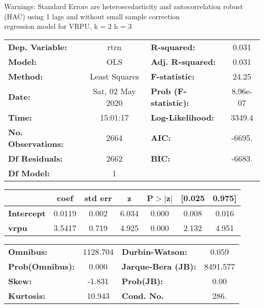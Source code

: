 Warnings: \newline
 [1] Standard Errors are heteroscedasticity and autocorrelation robust (HAC) using 1 lags and without small sample correction\\ 

regression model for VRPU, k = 2 h = 3\begin{center}
\begin{tabular}{lclc}
\toprule
\textbf{Dep. Variable:}    &       rtrn       & \textbf{  R-squared:         } &     0.031   \\
\textbf{Model:}            &       OLS        & \textbf{  Adj. R-squared:    } &     0.031   \\
\textbf{Method:}           &  Least Squares   & \textbf{  F-statistic:       } &     24.25   \\
\textbf{Date:}             & Sat, 02 May 2020 & \textbf{  Prob (F-statistic):} &  8.96e-07   \\
\textbf{Time:}             &     15:01:17     & \textbf{  Log-Likelihood:    } &    3349.4   \\
\textbf{No. Observations:} &        2664      & \textbf{  AIC:               } &    -6695.   \\
\textbf{Df Residuals:}     &        2662      & \textbf{  BIC:               } &    -6683.   \\
\textbf{Df Model:}         &           1      & \textbf{                     } &             \\
\bottomrule
\end{tabular}
\begin{tabular}{lcccccc}
                   & \textbf{coef} & \textbf{std err} & \textbf{z} & \textbf{P$> |$z$|$} & \textbf{[0.025} & \textbf{0.975]}  \\
\midrule
\textbf{Intercept} &       0.0119  &        0.002     &     6.034  &         0.000        &        0.008    &        0.016     \\
\textbf{vrpu}      &       3.5417  &        0.719     &     4.925  &         0.000        &        2.132    &        4.951     \\
\bottomrule
\end{tabular}
\begin{tabular}{lclc}
\textbf{Omnibus:}       & 1128.704 & \textbf{  Durbin-Watson:     } &    0.059  \\
\textbf{Prob(Omnibus):} &   0.000  & \textbf{  Jarque-Bera (JB):  } & 8491.577  \\
\textbf{Skew:}          &  -1.831  & \textbf{  Prob(JB):          } &     0.00  \\
\textbf{Kurtosis:}      &  10.943  & \textbf{  Cond. No.          } &     286.  \\
\bottomrule
\end{tabular}
\end{center}

